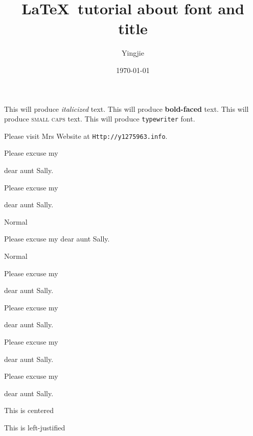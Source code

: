 \documentclass[11pt]{article}
\begin{document}
\tableofcontents

\title{\LaTeX \ tutorial about font and title}
\author{Yingjie}
\date{\today}
\maketitle

This will produce \textit{italicized} text.
This will produce \textbf{bold-faced} text.
This will produce \textsc{small caps} text.
This will produce \texttt{typewriter} font.

Please visit Mrs Website at \texttt{Http://y1275963.info}.



Please excuse my \begin{tiny} dear aunt Sally.\end{tiny}

Please excuse my \begin{small} dear aunt Sally.\end{small}

\begin{center} Normal \end{center}
Please excuse my dear aunt Sally.
\begin{center} Normal \end{center}

Please excuse my \begin{large}dear aunt Sally.\end{large}

Please excuse my \begin{Large} dear aunt Sally.\end{Large}

Please excuse my \begin{huge} dear aunt Sally.\end{huge}

Please excuse my \begin{Huge} dear aunt Sally.\end{Huge}




\begin{center} This is centered \end{center}

\begin{flushleft} This is left-justified \end{flushleft}
\end{document}
